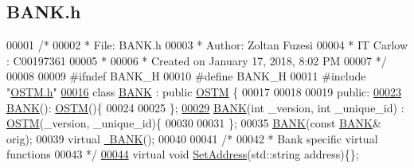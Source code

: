 \hypertarget{_b_a_n_k_8h_source}{}\subsection{B\+A\+N\+K.\+h}

\begin{DoxyCode}
00001 \textcolor{comment}{/* }
00002 \textcolor{comment}{ * File:   BANK.h}
00003 \textcolor{comment}{ * Author: Zoltan Fuzesi}
00004 \textcolor{comment}{ * IT Carlow : C00197361}
00005 \textcolor{comment}{ *}
00006 \textcolor{comment}{ * Created on January 17, 2018, 8:02 PM}
00007 \textcolor{comment}{ */}
00008 
00009 \textcolor{preprocessor}{#ifndef BANK\_H}
00010 \textcolor{preprocessor}{#define BANK\_H}
00011 \textcolor{preprocessor}{#include "\hyperlink{_o_s_t_m_8h}{OSTM.h}"}
\hypertarget{_b_a_n_k_8h_source.tex_l00016}{}\hyperlink{class_b_a_n_k}{00016} \textcolor{keyword}{class }\hyperlink{class_b_a_n_k}{BANK} : \textcolor{keyword}{public} \hyperlink{class_o_s_t_m}{OSTM} \{
00017 
00018     
00019 \textcolor{keyword}{public}:
\hypertarget{_b_a_n_k_8h_source.tex_l00023}{}\hyperlink{class_b_a_n_k_a0bc938356cebff14fb0560264abe5a34_a0bc938356cebff14fb0560264abe5a34}{00023}     \hyperlink{class_b_a_n_k_a0bc938356cebff14fb0560264abe5a34_a0bc938356cebff14fb0560264abe5a34}{BANK}(): \hyperlink{class_o_s_t_m}{OSTM}()\{
00024         
00025     \};
\hypertarget{_b_a_n_k_8h_source.tex_l00029}{}\hyperlink{class_b_a_n_k_a7382dd275d8f4f10a8b53ccbc93e1e87_a7382dd275d8f4f10a8b53ccbc93e1e87}{00029}     \hyperlink{class_b_a_n_k_a7382dd275d8f4f10a8b53ccbc93e1e87_a7382dd275d8f4f10a8b53ccbc93e1e87}{BANK}(\textcolor{keywordtype}{int} \_version, \textcolor{keywordtype}{int} \_unique\_id) : \hyperlink{class_o_s_t_m}{OSTM}(\_version, \_unique\_id)\{
00030         
00031     \};
00035     \hyperlink{class_b_a_n_k_a0bc938356cebff14fb0560264abe5a34_a0bc938356cebff14fb0560264abe5a34}{BANK}(\textcolor{keyword}{const} \hyperlink{class_b_a_n_k}{BANK}& orig);
00039     \textcolor{keyword}{virtual} \hyperlink{class_b_a_n_k_ad609a1e004efdebab6495d95eced2346_ad609a1e004efdebab6495d95eced2346}{~BANK}();
00040     
00041     \textcolor{comment}{/*}
00042 \textcolor{comment}{     * Bank specific virtual functions}
00043 \textcolor{comment}{     */}
\hypertarget{_b_a_n_k_8h_source.tex_l00044}{}\hyperlink{class_b_a_n_k_a52ad99454b2059d44967868157208393_a52ad99454b2059d44967868157208393}{00044}     \textcolor{keyword}{virtual} \textcolor{keywordtype}{void} \hyperlink{class_b_a_n_k_a52ad99454b2059d44967868157208393_a52ad99454b2059d44967868157208393}{SetAddress}(std::string address)\{\};

\end{DoxyCode}

